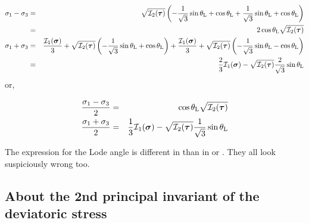 \begin{eqnarray}
\sigma_1 -\sigma_3
&=&  \sqrt{{\cal I}_2({\bm \tau})} \left( 
-\frac{1}{\sqrt{3}}\sin \theta_{\rm L}  + \cos \theta_{\rm L} 
+\frac{1}{\sqrt{3}}\sin \theta_{\rm L}  + \cos \theta_{\rm L} \right) \nonumber\\
&=& 2 \cos \theta_{\rm L} \sqrt{{\cal I}_2({\bm \tau})} \\ 
\sigma_1 + \sigma_3 
&=&   
\frac{{\cal I}_1({\bm \sigma})}{3} + \sqrt{{\cal I}_2({\bm \tau})} \left(-\frac{1}{\sqrt{3}}\sin 
\theta_{\rm L}  + \cos \theta_{\rm L} \right)   
+\frac{{\cal I}_1({\bm \sigma})}{3} + \sqrt{{\cal I}_2({\bm \tau})} \left(-\frac{1}{\sqrt{3}}\sin 
\theta_{\rm L}  - \cos \theta_{\rm L} \right)   
 \nonumber\\
&=& 
\frac{2}{3} {\cal I}_1({\bm \sigma}) -\sqrt{ {\cal I}_2({\bm \tau})} \frac{2}{\sqrt{3}}\sin \theta_{\rm L} 
\end{eqnarray}
or, 
\begin{mdframed}[backgroundcolor=blue!5]
\begin{eqnarray}
\frac{\sigma_1 -\sigma_3}{2} &=&  \cos \theta_{\rm L} \sqrt{{\cal I}_2({\bm \tau})}  \label{eq:sig13a} \\
\frac{\sigma_1 + \sigma_3}{2} &=& \frac{1}{3} {\cal I}_1({\bm \sigma}) -\sqrt{{\cal I}_2({\bm \tau})} \frac{1}{\sqrt{3}}\sin \theta_{\rm L} \label{eq:sig13b}
\end{eqnarray}
\end{mdframed}



\begin{remark}
The expression for the Lode angle is different in \cite[p101]{book_zitf} than in \cite{zico74} or \cite[p62]{zita2}. They all look suspiciously wrong too.
\end{remark}


\subsection{About the 2nd principal invariant of the deviatoric stress}


